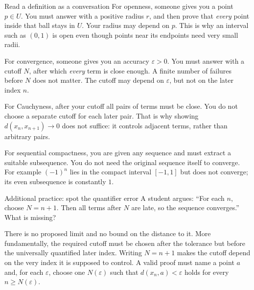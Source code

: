 \begin{note}{Read a definition as a conversation}
For openness, someone gives you a point $p\in U$. You must answer with a positive radius $r$, and then prove that \emph{every} point inside that ball stays in $U$. Your radius may depend on $p$. This is why an interval such as $(0,1)$ is open even though points near its endpoints need very small radii.

For convergence, someone gives you an accuracy $\varepsilon>0$. You must answer with a cutoff $N$, after which \emph{every} term is close enough. A finite number of failures before $N$ does not matter. The cutoff may depend on $\varepsilon$, but not on the later index $n$.

For Cauchyness, after your cutoff all pairs of terms must be close. You do not choose a separate cutoff for each later pair. That is why showing $d(x_n,x_{n+1})\to0$ does not suffice: it controls adjacent terms, rather than arbitrary pairs.

For sequential compactness, you are given any sequence and must extract a suitable subsequence. You do not need the original sequence itself to converge. For example $(-1)^n$ lies in the compact interval $[-1,1]$ but does not converge; its even subsequence is constantly $1$.
\end{note}
\begin{exam}{Additional practice: spot the quantifier error}
A student argues: ``For each $n$, choose $N=n+1$. Then all terms after $N$ are late, so the sequence converges.'' What is missing?
\end{exam}
\begin{answer}
There is no proposed limit and no bound on the distance to it. More fundamentally, the required cutoff must be chosen after the tolerance but before the universally quantified later index. Writing $N=n+1$ makes the cutoff depend on the very index it is supposed to control. A valid proof must name a point $a$ and, for each $\varepsilon$, choose one $N(\varepsilon)$ such that $d(x_n,a)<\varepsilon$ holds for every $n\ge N(\varepsilon)$.
\end{answer}


